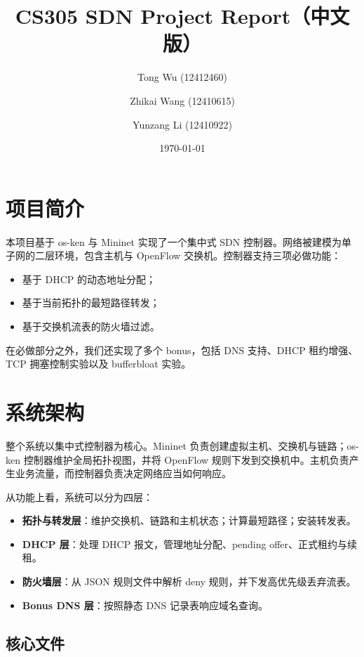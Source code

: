\documentclass[11pt,a4paper]{ctexart}
\title{CS305 SDN Project Report（中文版）}
\author{
    Tong Wu (12412460) \and
    Zhikai Wang (12410615) \and
    Yunzang Li (12410922)
}
\date{\today}
\begin{document}
\maketitle

\section{项目简介}

本项目基于 os-ken 与 Mininet 实现了一个集中式 SDN 控制器。网络被建模为单子网的二层环境，包含主机与 OpenFlow 交换机。控制器支持三项必做功能：

\begin{itemize}[leftmargin=1.5em]
    \item 基于 DHCP 的动态地址分配；
    \item 基于当前拓扑的最短路径转发；
    \item 基于交换机流表的防火墙过滤。
\end{itemize}

在必做部分之外，我们还实现了多个 bonus，包括 DNS 支持、DHCP 租约增强、TCP 拥塞控制实验以及 bufferbloat 实验。

\section{系统架构}

整个系统以集中式控制器为核心。Mininet 负责创建虚拟主机、交换机与链路；os-ken 控制器维护全局拓扑视图，并将 OpenFlow 规则下发到交换机中。主机负责产生业务流量，而控制器负责决定网络应当如何响应。

从功能上看，系统可以分为四层：

\begin{itemize}[leftmargin=1.5em]
    \item \textbf{拓扑与转发层}：维护交换机、链路和主机状态；计算最短路径；安装转发表。
    \item \textbf{DHCP 层}：处理 DHCP 报文，管理地址分配、pending offer、正式租约与续租。
    \item \textbf{防火墙层}：从 JSON 规则文件中解析 deny 规则，并下发高优先级丢弃流表。
    \item \textbf{Bonus DNS 层}：按照静态 DNS 记录表响应域名查询。
\end{itemize}

\subsection{核心文件}
\end{document}
